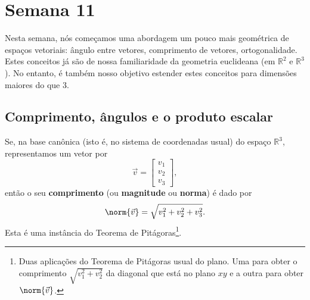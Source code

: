 

\providecommand{\dir}{..}


%

\chapter{Semana 11}


Nesta semana, nós começamos uma abordagem um pouco mais geométrica de espaços vetoriais: ângulo entre vetores, comprimento de vetores, ortogonalidade. Estes conceitos já são de nossa familiaridade da geometria euclideana (em $\mathbb{R}^2$ e $\mathbb{R}^3$). No entanto, é também nosso objetivo estender estes conceitos para dimensões maiores do que $3$.


\section{Comprimento, ângulos e o produto escalar}

Se, na base canônica (isto é, no sistema de coordenadas usual) do espaço $\mathbb{R}^3$, representamos um vetor por
\begin{equation}
\vec{v} =
\begin{bmatrix}
v_1 \\ v_2 \\ v_3
\end{bmatrix},
\end{equation} então o seu \textbf{comprimento} (ou \textbf{magnitude} ou \textbf{norma}) é dado por
\begin{equation}
\norm{\vec{v}} = \sqrt{v_1^2 + v_2^2 + v_3^2}.
\end{equation} Esta é uma instância do Teorema de Pitágoras\footnote{Duas aplicações do Teorema de Pitágoras usual do plano. Uma para obter o comprimento $\sqrt{v_1^2 + v_2^2}$ da diagonal que está no plano $xy$ e a outra para obter $\norm{\vec{v}}$.}.

